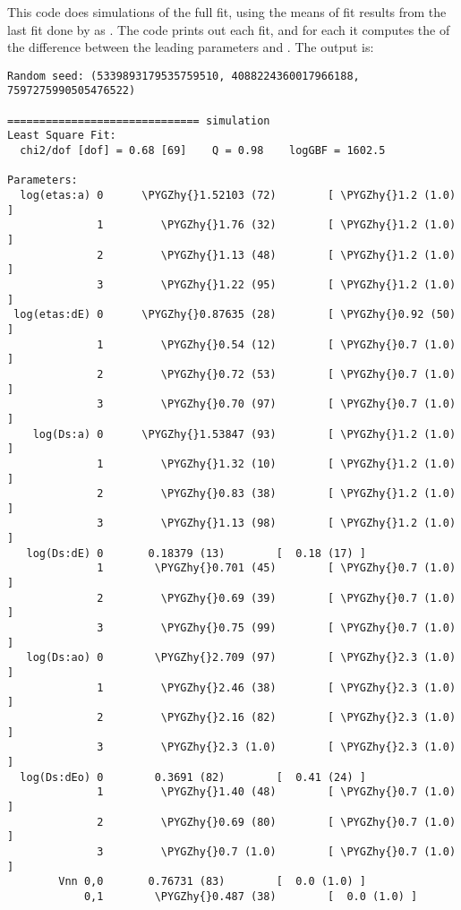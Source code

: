 \documentclass[letterpaper,10pt,english]{sphinxmanual}
\def\PYGZhy{\char`\-}
\begin{document}
\begin{itemize}
This code does  simulations of the full fit, using the means of fit
results from the last fit done by  as .
The code prints out each fit,
and for each it computes the  of the difference between the leading
parameters and . The output is:

\begin{Verbatim}[commandchars=\\\{\}]
Random seed: (5339893179535759510, 4088224360017966188, 7597275990505476522)

============================== simulation
Least Square Fit:
  chi2/dof [dof] = 0.68 [69]    Q = 0.98    logGBF = 1602.5

Parameters:
  log(etas:a) 0      \PYGZhy{}1.52103 (72)        [ \PYGZhy{}1.2 (1.0) ]  
              1         \PYGZhy{}1.76 (32)        [ \PYGZhy{}1.2 (1.0) ]  
              2         \PYGZhy{}1.13 (48)        [ \PYGZhy{}1.2 (1.0) ]  
              3         \PYGZhy{}1.22 (95)        [ \PYGZhy{}1.2 (1.0) ]  
 log(etas:dE) 0      \PYGZhy{}0.87635 (28)        [ \PYGZhy{}0.92 (50) ]  
              1         \PYGZhy{}0.54 (12)        [ \PYGZhy{}0.7 (1.0) ]  
              2         \PYGZhy{}0.72 (53)        [ \PYGZhy{}0.7 (1.0) ]  
              3         \PYGZhy{}0.70 (97)        [ \PYGZhy{}0.7 (1.0) ]  
    log(Ds:a) 0      \PYGZhy{}1.53847 (93)        [ \PYGZhy{}1.2 (1.0) ]  
              1         \PYGZhy{}1.32 (10)        [ \PYGZhy{}1.2 (1.0) ]  
              2         \PYGZhy{}0.83 (38)        [ \PYGZhy{}1.2 (1.0) ]  
              3         \PYGZhy{}1.13 (98)        [ \PYGZhy{}1.2 (1.0) ]  
   log(Ds:dE) 0       0.18379 (13)        [  0.18 (17) ]  
              1        \PYGZhy{}0.701 (45)        [ \PYGZhy{}0.7 (1.0) ]  
              2         \PYGZhy{}0.69 (39)        [ \PYGZhy{}0.7 (1.0) ]  
              3         \PYGZhy{}0.75 (99)        [ \PYGZhy{}0.7 (1.0) ]  
   log(Ds:ao) 0        \PYGZhy{}2.709 (97)        [ \PYGZhy{}2.3 (1.0) ]  
              1         \PYGZhy{}2.46 (38)        [ \PYGZhy{}2.3 (1.0) ]  
              2         \PYGZhy{}2.16 (82)        [ \PYGZhy{}2.3 (1.0) ]  
              3         \PYGZhy{}2.3 (1.0)        [ \PYGZhy{}2.3 (1.0) ]  
  log(Ds:dEo) 0        0.3691 (82)        [  0.41 (24) ]  
              1         \PYGZhy{}1.40 (48)        [ \PYGZhy{}0.7 (1.0) ]  
              2         \PYGZhy{}0.69 (80)        [ \PYGZhy{}0.7 (1.0) ]  
              3         \PYGZhy{}0.7 (1.0)        [ \PYGZhy{}0.7 (1.0) ]  
        Vnn 0,0       0.76731 (83)        [  0.0 (1.0) ]  
            0,1        \PYGZhy{}0.487 (38)        [  0.0 (1.0) ]  

\end{Verbatim}
\end{itemize}
\end{document}

